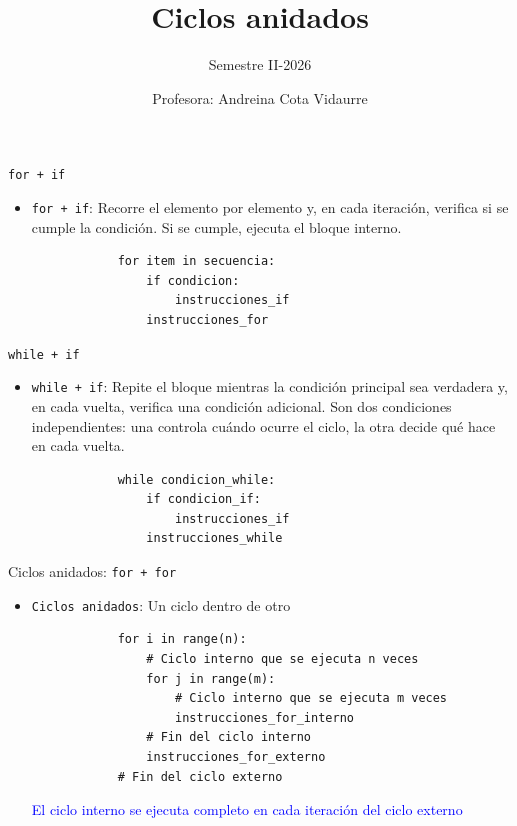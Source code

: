 \documentclass{beamer}
\title{Ciclos anidados} %
\subtitle{Semestre II-2026} %
\author{Profesora: Andreina Cota Vidaurre}
\begin{document}
  \shorthandoff{-}
  \frame[c]{\maketitle}


    \begin{frame}[fragile, t]{\texttt{for + if}}
        \begin{itemize}
            \item \texttt{for + if}: Recorre el elemento por elemento y, en cada iteración, verifica si se cumple la condición. Si se cumple, ejecuta el bloque interno.
            \begin{verbatim}
            for item in secuencia:
                if condicion:
                    instrucciones_if
                instrucciones_for
            \end{verbatim}
        \end{itemize}
    \end{frame}

    \begin{frame}[fragile, t]{\texttt{while + if}}
        \begin{itemize}
            \item \texttt{while + if}: Repite el bloque mientras la condición principal sea verdadera y, en cada vuelta, verifica una condición adicional. Son dos condiciones independientes: una controla cuándo ocurre el ciclo, la otra decide qué hace en cada vuelta.
            \begin{verbatim}
            while condicion_while:
                if condicion_if:
                    instrucciones_if
                instrucciones_while
            \end{verbatim}
        \end{itemize}
    \end{frame}

    \begin{frame}[fragile, t]{Ciclos anidados: \texttt{for + for}}
        \begin{itemize}
            \item \texttt{Ciclos anidados}: Un ciclo dentro de otro
            \begin{verbatim}
            for i in range(n):
                # Ciclo interno que se ejecuta n veces
                for j in range(m):
                    # Ciclo interno que se ejecuta m veces
                    instrucciones_for_interno
                # Fin del ciclo interno
                instrucciones_for_externo
            # Fin del ciclo externo
            \end{verbatim}
            \textcolor{blue}{El ciclo interno se ejecuta completo en cada iteración del ciclo externo}
        \end{itemize}
    \end{frame}
\end{document}
